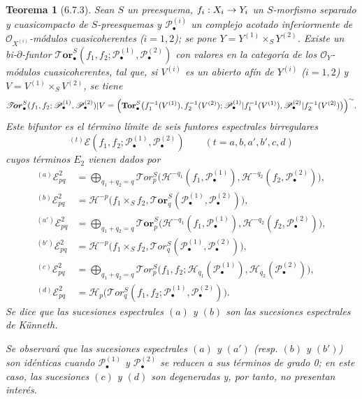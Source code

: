 \documentclass[10pt,oneside,openany]{book}
\theoremstyle{egaenv}\newtheorem*{env}{---}
\theoremstyle{egastatement}
\newtheorem*{theorem}{Teorema}
\theoremstyle{egadescription}
\newcommand{\oldpage}[2][]{\marginnote{\normalfont\scriptsize\textbf{#1}\,|\,#2}\ignorespaces}
\renewcommand{\to}{\mathchoice{\longrightarrow}{\rightarrow}{\rightarrow}{\rightarrow}}
\begin{document}
\begin{theorem}[6.7.3]
\label{III.6.7.3}
Sean $S$ un preesquema, $f_i:X_i\to Y_i$ un $S$-morfismo separado y
cuasicompacto de $S$-preesquemas y $\mathscr P_\bullet^{(i)}$ un complejo
acotado inferiormente de $\mathscr O_{X^{(i)}}$-módulos cuasicoherentes
($i=1,2$); se pone $Y=Y^{(1)}\times_S Y^{(2)}$. Existe un
bi-$\partial$-funtor
  $\boldsymbol{\mathscr{T}\!or}_\bullet^S
(f_1,f_2;\mathscr P_\bullet^{(1)},\mathscr P_\bullet^{(2)})$
con valores en la categoría de los $\mathscr O_Y$-módulos cuasicoherentes,
tal que, si $V^{(i)}$ es un abierto afín de $Y^{(i)}$ ($i=1,2$) y
$V=V^{(1)}\times_S V^{(2)}$, se tiene
\[
  \boldsymbol{\mathscr{T}\!or}_\bullet^S
  (f_1,f_2;\mathscr P_\bullet^{(1)},\mathscr P_\bullet^{(2)})|V
  =\Bigl(\mathbf{Tor}_\bullet^S
    \bigl(f_1^{-1}(V^{(1)}),f_2^{-1}(V^{(2)});
      \mathscr P_\bullet^{(1)}|f_1^{-1}(V^{(1)}),
      \mathscr P_\bullet^{(2)}|f_2^{-1}(V^{(2)})\bigr)\Bigr)^{\sim}.
\]
\oldpage[III]{159}
Este bifuntor es el término límite de seis funtores espectrales
birregulares
\[
  {}^{(t)}\mathscr E
  (f_1,f_2;\mathscr P_\bullet^{(1)},\mathscr P_\bullet^{(2)})
  \qquad(t=a,b,a',b',c,d)
\]
cuyos términos $E_2$ vienen dados por
\[
\begin{aligned}
  {}^{(a)}\mathscr E_{pq}^2
  &=\bigoplus_{q_1+q_2=q}
    \mathscr{T}\!or_p^S
    \bigl(\mathcal H^{-q_1}(f_1,\mathscr P_\bullet^{(1)}),
          \mathcal H^{-q_2}(f_2,\mathscr P_\bullet^{(2)})\bigr),\\
  {}^{(b)}\mathscr E_{pq}^2
  &=\mathscr H^{-p}\bigl(f_1\times_S f_2,
    \boldsymbol{\mathscr{T}\!or}_q^S
    (\mathscr P_\bullet^{(1)},\mathscr P_\bullet^{(2)})\bigr),\\
  {}^{(a')}\mathscr E_{pq}^2
  &=\bigoplus_{q_1+q_2=q}
    \boldsymbol{\mathscr{T}\!or}_p^S
    \bigl(\mathscr H^{-q_1}(f_1,\mathscr P_\bullet^{(1)}),
          \mathscr H^{-q_2}(f_2,\mathscr P_\bullet^{(2)})\bigr),\\
  {}^{(b')}\mathscr E_{pq}^2
  &=\mathcal H^{-p}\bigl(f_1\times_S f_2,
    \mathscr{T}\!or_q^S
    (\mathscr P_\bullet^{(1)},\mathscr P_\bullet^{(2)})\bigr),\\
  {}^{(c)}\mathscr E_{pq}^2
  &=\bigoplus_{q_1+q_2=q}
    \mathscr{T}\!or_p^S
    \bigl(f_1,f_2;
      \mathscr H_{q_1}(\mathscr P_\bullet^{(1)}),
      \mathscr H_{q_2}(\mathscr P_\bullet^{(2)})\bigr),\\
  {}^{(d)}\mathscr E_{pq}^2
  &=\mathscr H_p\bigl(\mathscr{T}\!or_q^S
    (f_1,f_2;\mathscr P_\bullet^{(1)},\mathscr P_\bullet^{(2)})\bigr).
\end{aligned}
\]
Se dice que las sucesiones espectrales $(a)$ y $(b)$ son las
\emph{sucesiones espectrales de Künneth}.

Se observará que las sucesiones espectrales $(a)$ y $(a')$ (resp.
$(b)$ y $(b')$) son idénticas cuando $\mathscr P_\bullet^{(1)}$ y
$\mathscr P_\bullet^{(2)}$ se reducen a sus términos de grado 0; en este caso,
las sucesiones $(c)$ y $(d)$ son degeneradas y, por tanto, no presentan
interés.
\end{theorem}
\end{document}
